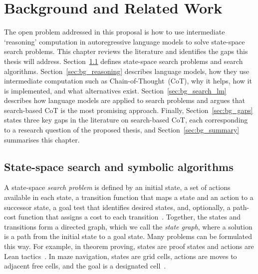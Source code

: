 \chapter{Background and Related Work}
\label{ch:background}

The open problem addressed in this proposal is how to use intermediate `reasoning' computation in autoregressive language models to solve state-space search problems.
This chapter reviews the literature and identifies the gaps this thesis will address.
Section~\ref{sec:bg_search} defines state-space search problems and search algorithms.
Section~\ref{sec:bg_reasoning} describes language models, how they use intermediate computation such as Chain-of-Thought~(CoT), why it helps, how it is implemented, and what alternatives exist.
Section~\ref{sec:bg_search_lm} describes how language models are applied to search problems and argues that search-based CoT is the most promising approach.
Finally, Section~\ref{sec:bg_gaps} states three key gaps in the literature on search-based CoT, each corresponding to a research question of the proposed thesis, and Section~\ref{sec:bg_summary} summarises this chapter.

\section{State-space search and symbolic algorithms}
\label{sec:bg_search}

A state-space \emph{search problem} is defined by an initial state, a set of actions available in each state, a transition function that maps a state and an action to a successor state, a goal test that identifies desired states, and, optionally, a path-cost function that assigns a cost to each transition~\citep{russel2010,newell1972human}.
Together, the states and transitions form a directed graph, which we call the \emph{state graph}, where a solution is a path from the initial state to a goal state.
Many problems can be formulated this way.
For example, in theorem proving, states are proof states and actions are Lean tactics~\citep{hubertAlphaProof2025}.
In maze navigation, states are grid cells, actions are moves to adjacent free cells, and the goal is a designated cell~\citep{lehnertBetterPlanningTransformers2024}.

